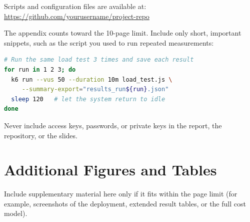 \documentclass[conference,a4paper]{IEEEtran}
\begin{document}
	Scripts and configuration files are available at: \url{https://github.com/yourusername/project-repo}
	
	The appendix counts toward the 10-page limit. Include only short, important snippets, such as the script you used to run repeated measurements:
	
	\begin{lstlisting}[language=bash, caption={Example: Repeated Load Test Runs}, label={lst:runs}]
# Run the same load test 3 times and save each result
for run in 1 2 3; do
  k6 run --vus 50 --duration 10m load_test.js \
     --summary-export="results_run${run}.json"
  sleep 120   # let the system return to idle
done
	\end{lstlisting}
	
	Never include access keys, passwords, or private keys in the report, the repository, or the slides.
	
	\section{Additional Figures and Tables}
	\label{app:additional}
	
	Include supplementary material here only if it fits within the page limit (for example, screenshots of the deployment, extended result tables, or the full cost model).
	
\end{document}
